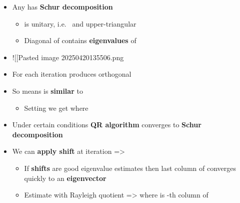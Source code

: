 \begin{itemize}

  \item
        Any  has \textbf{Schur
          decomposition} 

        \begin{itemize}

          \item
                 is unitary, i.e.~ and
                upper-triangular 
          \item
                Diagonal of  contains \textbf{eigenvalues} of 
        \end{itemize}
  \item
        !{[}{[}Pasted image 20250420135506.png\textbar300{]}{]}
  \item
        For  each iteration
         produces orthogonal
  \item
        So
        means  is \textbf{similar} to 

        \begin{itemize}

          \item
                Setting  we get
                 where
        \end{itemize}
  \item
        Under certain conditions \textbf{QR algorithm} converges to
        \textbf{Schur decomposition}
  \item
        We can \textbf{apply shift}  at iteration 
        =\textgreater{}

        \begin{itemize}

          \item
                If \textbf{shifts} are good eigenvalue estimates then last column of
                 converges quickly to an \textbf{eigenvector}
          \item
                Estimate  with Rayleigh quotient =\textgreater{}
                where  is -th column of
        \end{itemize}
\end{itemize}